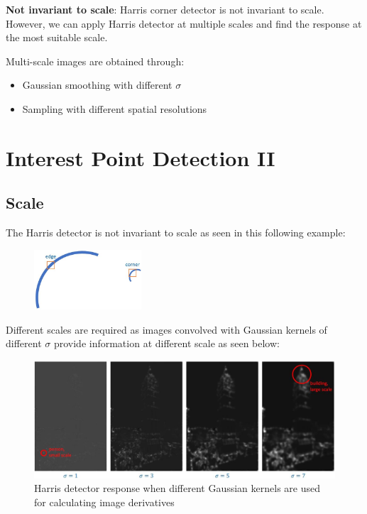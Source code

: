 \documentclass{report}
\begin{document}
\textbf{Not invariant to scale}: Harris corner detector is not invariant to
scale. However, we can apply Harris detector at multiple scales and find the
response at the most suitable scale.

Multi-scale images are obtained through:
\begin{itemize}
    \item Gaussian smoothing with different $\sigma$
    \item Sampling with different spatial resolutions
\end{itemize}

\chapter{Interest Point Detection II}

\section{Scale}

The Harris detector is not invariant to scale as seen in this following example:
\begin{figure}[h]
    \centering
    \includegraphics[width=4cm]{Harris scale.JPG}
\end{figure}

Different scales are required as images convolved with Gaussian kernels of
different $\sigma$ provide information at different scale as seen below:
\begin{figure}[h]
    \centering
    \includegraphics[width=14cm]{Harris different scale.JPG}
    \caption{Harris detector response when different Gaussian kernels are used for calculating image derivatives}
\end{figure}
\end{document}
